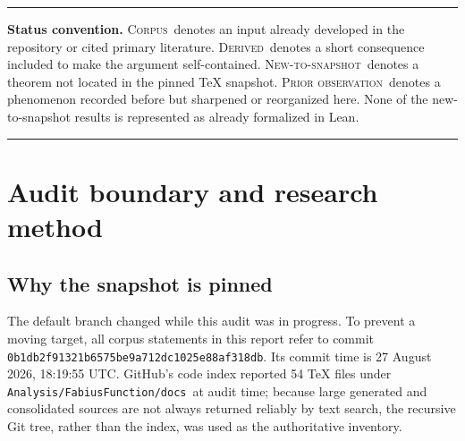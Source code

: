 \documentclass[11pt,oneside]{article}
\numberwithin{equation}{section}
\theoremstyle{definition}
\theoremstyle{remark}
\newcommand{\Up}{\operatorname{up}}
\newcommand{\Corpus}{\textsc{Corpus}}
\newcommand{\Derived}{\textsc{Derived}}
\newcommand{\NewResult}{\textsc{New-to-snapshot}}
\newcommand{\Observed}{\textsc{Prior observation}}
\newcommand{\repo}{\nolinkurl{Analysis/FabiusFunction/docs}}
\newcommand{\commit}{\nolinkurl{0b1db2f91321b6575be9a712dc1025e88af318db}}
\newenvironment{boxedremark}{%
  \par\medskip\noindent\begin{center}\begin{minipage}{0.94\textwidth}%
  \color{deepgray}\hrule\vspace{0.65em}\small
}{%
  \vspace{0.65em}\hrule\end{minipage}\end{center}\medskip
}
\begin{document}
\begin{abstract}
Claims marked \NewResult\ mean only that no counterpart was found in the frozen
TeX corpus after targeted collision searches.  They are proved here, but no claim
of worldwide historical priority is made.  In particular, Rvachev's 1977 paper
on approximation by $\Up$ and the broader Russian-language atomic-function
literature require a separate priority audit.
\end{abstract}

\begin{boxedremark}
\textbf{Status convention.}
\Corpus\ denotes an input already developed in the repository or cited primary
literature.  \Derived\ denotes a short consequence included to make the argument
self-contained.  \NewResult\ denotes a theorem not located in the pinned TeX
snapshot.  \Observed\ denotes a phenomenon recorded before but sharpened or
reorganized here.  None of the new-to-snapshot results is represented as already
formalized in Lean.
\end{boxedremark}

\tableofcontents
\newpage

\section{Audit boundary and research method}
\label{sec:audit}

\subsection{Why the snapshot is pinned}

The default branch changed while this audit was in progress.  To prevent a moving
target, all corpus statements in this report refer to commit \commit.  Its commit
time is 27 August 2026, 18:19:55 UTC.  GitHub's code index reported 54 TeX files
under \repo\ at audit time; because large generated and consolidated sources are
not always returned reliably by text search, the recursive Git tree, rather than
the index, was used as the authoritative inventory.
\end{document}
